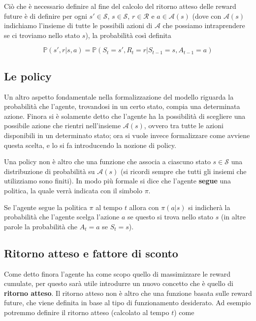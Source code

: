 \documentclass[a4paper,11pt,twoside]{report} %
\begin{document}
Ciò che è necessario definire al fine del calcolo del ritorno atteso delle reward future è di definire per ogni $s' \in \mathcal{S}$, $s \in \mathcal{S}$, $r \in \mathcal{R}$ e $a \in \mathcal{A}(s)$ (dove con $\mathcal{A}(s)$ indichiamo l'insieme di tutte le possibili azioni di $\mathcal{A}$ che possiamo intraprendere se ci troviamo nello stato $s$), la probabilità così definita

\begin{equation}
	\mathbb{P}(s',r|s,a)=\mathbb{P}(S_{t}=s', R_{t}=r | S_{t-1}=s, A_{t-1}=a)
\end{equation}

\subsection{Le policy}

Un altro aspetto fondamentale nella formalizzazione del modello riguarda la probabilità che l'agente, trovandosi in un certo stato, compia una determinata azione. Finora si è solamente detto che l'agente ha la possibilità di scegliere una possibile azione che rientri nell'insieme $\mathcal{A}(s)$, ovvero tra tutte le azioni disponibili in un determinato stato; ora si vuole invece formalizzare come avviene questa scelta, 
e lo si fa introducendo la nozione di policy.

Una policy non è altro che una funzione che associa a ciascuno stato $s \in \mathcal{S}$ una distribuzione di probabilità su $\mathcal{A}(s)$ (si ricordi sempre che tutti gli insiemi che utilizziamo sono finiti). In modo più formale si dice che l'agente \textbf{segue} una politica, la quale verrà indicata con il simbolo $\pi$.

Se l'agente segue la politica $\pi$ al tempo $t$ allora con $\pi(a|s)$ si indicherà la probabilità che l'agente scelga l'azione $a$ se questo si trova nello stato $s$ (in altre parole la probabilità che $A_{t}=a$ se $S_{t}=s$).

\subsection{Ritorno atteso e fattore di sconto}

Come detto finora l'agente ha come scopo quello di massimizzare le reward cumulate, per questo sarà utile introdurre un nuovo concetto che è quello di \textbf{ritorno atteso}. Il ritorno atteso non è altro che una funzione basata sulle reward future, che viene definita in base al tipo di funzionamento desiderato. Ad esempio potremmo definire il ritorno atteso (calcolato al tempo $t$) come
\end{document}
